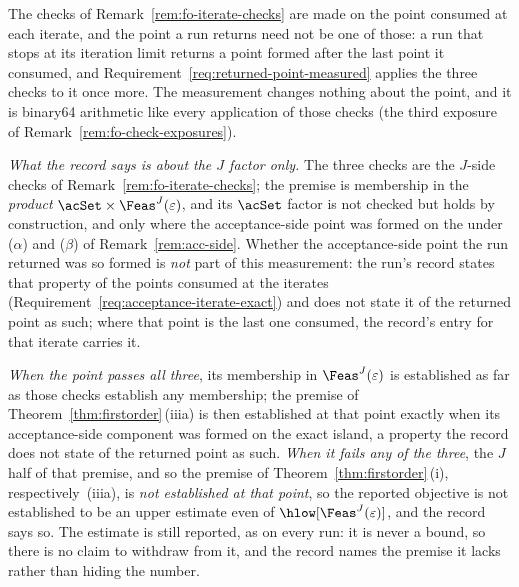 \begin{remark}\label{rem:fo-returned-point}
The checks of Remark~\ref{rem:fo-iterate-checks} are made on the point
consumed at each iterate, and the point a run returns need not be one of
those: a run that stops at its iteration limit returns a point formed after
the last point it consumed, and
Requirement~\ref{req:returned-point-measured} applies the three checks to it
once more. The measurement changes nothing about the point, and it is
binary64 arithmetic like every application of those checks (the third
exposure of Remark~\ref{rem:fo-check-exposures}).

\emph{What the record says is about the $J$ factor only.} The three checks
are the $J$-side checks of Remark~\ref{rem:fo-iterate-checks}; the premise is
membership in the \emph{product} $\acSet\times\Feas^{J}(\varepsilon)$, and
its $\acSet$ factor is not checked but holds by construction, and only where
the acceptance-side point was formed on the  under
($\alpha$) and ($\beta$) of Remark~\ref{rem:acc-side}. Whether the
acceptance-side point the run returned was so formed is \emph{not} part of
this measurement: the run's record states that property of the points
consumed at the iterates (Requirement~\ref{req:acceptance-iterate-exact})
and does not state it of the returned point as such; where that point is the
last one consumed, the record's entry for that iterate carries it.

\emph{When the point passes all three}, its membership in
$\Feas^{J}(\varepsilon)$ is established as far as those checks establish
any membership; the premise of Theorem~\ref{thm:firstorder}\,(iiia) is then
established at that point exactly when its acceptance-side component was
formed on the exact island, a property the record does not state of the
returned point as such. \emph{When it fails any of the three}, the $J$ half
of that premise, and so the premise of Theorem~\ref{thm:firstorder}\,(i),
respectively~(iiia), is \emph{not established at that point}, so the
reported objective is not established to be an upper estimate even of
$\hlow[\Feas^{J}(\varepsilon)]$, and the record says so. The estimate is
still reported, as on every run: it is never a bound, so there is no claim
to withdraw from it, and the record names the premise it lacks rather than
hiding the number.


\end{remark}
